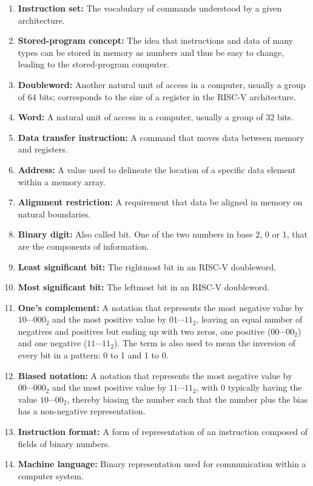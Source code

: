 \documentclass{article}
\begin{document}
\begin{enumerate}
    \item \textbf{Instruction set:} The vocabulary of commands understood by a given architecture.
    \item \textbf{Stored-program concept:} The idea that instructions and data of many types can be stored in memory as numbers and thus be easy to change, leading to the stored-program computer.
    \item \textbf{Doubleword:} Another natural unit of access in a computer, usually a group of 64 bits; corresponds to the size of a register in the RISC-V architecture.
    \item \textbf{Word:} A natural unit of access in a computer, usually a group of 32 bits.
    \item \textbf{Data transfer instruction:} A command that moves data between memory and registers.
    \item \textbf{Address:} A value used to delineate the location of a specific data element within a memory array.
    \item \textbf{Alignment restriction:} A requirement that data be aligned in memory on natural boundaries.
    \item \textbf{Binary digit:} Also called bit. One of the two numbers in base 2, 0 or 1, that are the components of information.
    \item \textbf{Least significant bit:} The rightmost bit in an RISC-V doubleword.
    \item \textbf{Most significant bit:} The leftmost bit in an RISC-V doubleword.
    \item \textbf{One's complement:} A notation that represents the most negative value by $10\cdots000_2$ and the most positive value by $01\cdots11_2$, leaving an equal number of negatives and positives but ending up with two zeros, one positive ($00\cdots00_2$) and one negative ($11\cdots11_2$). The term is also used to mean the inversion of every bit in a pattern: 0 to 1 and 1 to 0.
    \item \textbf{Biased notation:} A notation that represents the most negative value by $00\cdots000_2$ and the most positive value by $11\cdots11_2$, with 0 typically having the value $10\cdots00_2$, thereby biasing the number such that the number plus the bias has a non-negative representation.
    \item \textbf{Instruction format:} A form of representation of an instruction composed of fields of binary numbers.
    \item \textbf{Machine language:} Binary representation used for communication within a computer system.

\end{enumerate}
\end{document}
